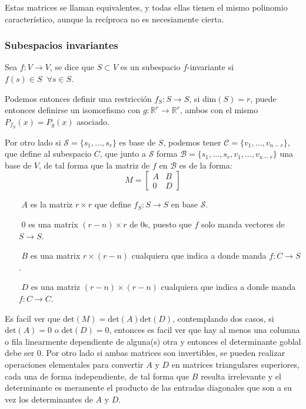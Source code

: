 \documentclass{preset}
\begin{document}
Estas matrices se llaman equivalentes, y todas ellas tienen el mismo polinomio característico, aunque la recíproca no es necesiamente cierta.

\vspace{-15pt}
\subsubsection{Subespacios invariantes}
Sea $f: V \rightarrow V$, se dice que $S \subset V$ es un subespacio $f$-invariante si $f(s)\in S \;\; \forall s \in S$.

Podemos entonces definir una restricción $f_S : S \rightarrow S$, si dim$(S)=r$, puede entonces definirse un isomorfismo con $g: \mathbb{R}^r \rightarrow \mathbb{R}^r$, ambos con el mismo $P_{f_S}(x)=P_g(x)$ asociado.

Por otro lado si $\mathcal{S}=\{s_1,\dots,s_r\}$ es base de $S$, podemos tener $\mathcal{C}=\{v_1, \dots , v_{n-r}\}$, que define al subespacio $C$, que junto a $\mathcal{S}$ forma $\mathcal{B}=\{s_1,\dots,s_r, v_1, \dots , v_{n-r}\}$ una base de $V$, de tal forma que la matriz de $f$ en $\mathcal{B}$ es de la forma:
\vspace{-5pt}
\[M = \left[\begin{array}{c|c}
      A & B\\
      \hline
      0 & D
    \end{array}\right]\]

\vspace{-10pt}
\begin{itemize}
	\item[$ $] $A$ es la matriz $r \times r$ que define $f_S : S \rightarrow S$ en base $\mathcal{S}$.
	\vspace{-10pt}
    \item[$ $] $0$ es una matrix $(r-n)\times r$ de 0s, puesto que $f$ solo manda vectores de $S \rightarrow S$.
    \vspace{-10pt}
    \item[$ $] $B$ es una matrix $r\times (r-n)$ cualquiera  que indica a donde manda $f: C \rightarrow S$.
    \vspace{-10pt}
    \item[$ $] $D$ es una matriz $(r-n) \times (r-n)$ cualquiera que indica a donde manda $f: C \rightarrow C$.
\end{itemize} 

Es facil ver que $\mbox{det}(M)=\mbox{det}(A)\mbox{det}(D)$, contemplando dos casos, si $\mbox{det}(A)=0$ o $\mbox{det}(D)=0$, entonces es facil ver que hay al menos una columna o fila linearmente dependiente de alguna(s) otra y entonces el determinante goblal debe ser 0. Por otro lado si ambas matrices son invertibles, se pueden realizar operaciones elementales para convertir $A$ y $D$ en matrices triangulares superiores, cada una de forma independiente, de tal forma que $B$ resulta irrelevante y el determinante es meramente el producto de las entradas diagonales que son a su vez los determinantes de $A$ y $D$.
\end{document}
